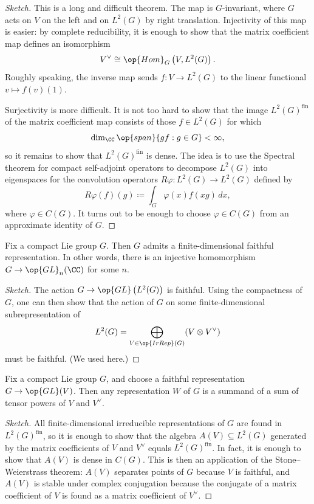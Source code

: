 \documentclass{article}
\begin{document}
\begin{proof}[Sketch]
	This is a long and difficult theorem. The map is $G$-invariant, where $G$ acts on $V$ on the left and on $L^2(G)$ by right translation. Injectivity of this map is easier: by complete reducibility, it is enough to show that the matrix coefficient map defines an isomorphism
	\[V^\lor\cong\op{Hom}_G\left(V,L^2(G)\right).\]
	Roughly speaking, the inverse map sends $f\colon V\to L^2(G)$ to the linear functional $v\mapsto f(v)(1)$.

	Surjectivity is more difficult. It is not too hard to show that the image $L^2(G)^{\mathrm{fin}}$ of the matrix coefficient map consists of those $f\in L^2(G)$ for which
	\[\dim_\CC\op{span}\{gf:g\in G\}<\infty,\]
	so it remains to show that $L^2(G)^{\mathrm{fin}}$ is dense. The idea is to use the Spectral theorem for compact self-adjoint operators to decompose $L^2(G)$ into eigenspaces for the convolution operators $R\varphi\colon L^2(G)\to L^2(G)$ defined by
	\[R\varphi(f)(g)\coloneqq\int_G\varphi(x)f(xg)\,dx,\]
	where $\varphi\in C(G)$. It turns out to be enough to choose $\varphi\in C(G)$ from an approximate identity of $G$.
\end{proof}
\begin{corollary}
	Fix a compact Lie group $G$. Then $G$ admits a finite-dimensional faithful representation. In other words, there is an injective homomorphism $G\to\op{GL}_n(\CC)$ for some $n$.
\end{corollary}
\begin{proof}[Sketch]
	The action $G\to\op{GL}\left(L^2(G)\right)$ is faithful. Using the compactness of $G$, one can then show that the action of $G$ on some finite-dimensional subrepresentation of
	\[L^2(G)=\bigoplus_{V\in\op{IrRep}(G)}(V\otimes V^\lor)\]
	must be faithful. (We used  here.)
\end{proof}
\begin{corollary} \label{cor:faithful-generates}
	Fix a compact Lie group $G$, and choose a faithful representation $G\to\op{GL}(V)$. Then any representation $W$ of $G$ is a summand of a sum of tensor powers of $V$ and $V^\lor$.
\end{corollary}
\begin{proof}[Sketch]
	All finite-dimensional irreducible representations of $G$ are found in $L^2(G)^{\mathrm{fin}}$, so it is enough to show that the algebra $A(V)\subseteq L^2(G)$ generated by the matrix coefficients of $V$ and $V^\lor$ equals $L^2(G)^{\mathrm{fin}}$. In fact, it is enough to show that $A(V)$ is dense in $C(G)$. This is then an application of the Stone--Weierstrass theorem: $A(V)$ separates points of $G$ because $V$ is faithful, and $A(V)$ is stable under complex conjugation because the conjugate of a matrix coefficient of $V$ is found as a matrix coefficient of $V^\lor$.
\end{proof}
\end{document}
